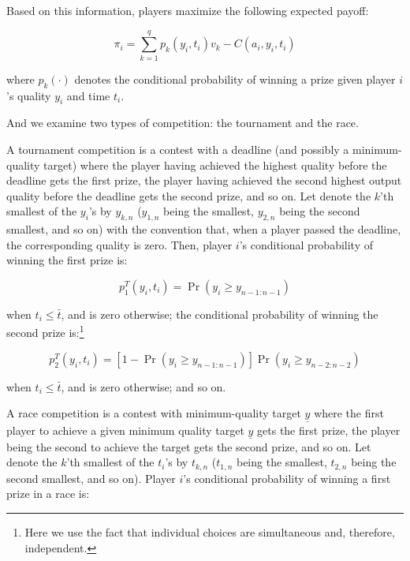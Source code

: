 \documentclass[11pt, titlepage]{article}
\newcommand\deadline{\bar{t}}
\newcommand\target{\underline{y}}
\begin{document}
Based on this information, players maximize the following expected
payoff:

\begin{equation} 
    \label{expected payoff}
    \pi_i = \sum_{k=1}^{q} p_{k}(y_i, t_i) v_k - C(a_i, y_i, t_i)
\end{equation}

where \(p_{k}(\cdot)\) denotes the conditional probability of winning a
prize given player \(i\)'s quality \(y_i\) and time \(t_i\).

And we examine two types of competition: the tournament and the race.

A tournament competition is a contest with a deadline (and possibly a
minimum-quality target) where the player having achieved the highest
quality before the deadline gets the first prize, the player having
achieved the second highest output quality before the deadline gets the
second prize, and so on. Let denote the \(k\)'th smallest of the
\(y_i\)'s by \(y_{k, n}\) (\(y_{1, n}\) being the smallest, \(y_{2, n}\)
being the second smallest, and so on) with the convention that, when a
player passed the deadline, the corresponding quality is zero. Then,
player \(i\)'s conditional probability of winning the first prize is:

\begin{equation}
    p^{T}_{1}(y_i, t_i) = \Pr(y_i \geq y_{n-1:n-1})
\end{equation}

when \(t_i\leq\deadline\), and is zero otherwise; the conditional
probability of winning the second prize is:\footnote{Here we use the
  fact that individual choices are simultaneous and, therefore,
  independent.}

\begin{equation}
    p^{T}_{2}(y_i, t_i) =  [1 - \Pr(y_i \geq y_{n-1:n-1})]  \Pr(y_i \geq y_{n-2:n-2})
\end{equation}

when \(t_i\leq \deadline\), and is zero otherwise; and so on.

A race competition is a contest with minimum-quality target \(\target\)
where the first player to achieve a given minimum quality target
\(\target\) gets the first prize, the player being the second to achieve
the target gets the second prize, and so on. Let denote the \(k\)'th
smallest of the \(t_i\)'s by \(t_{k, n}\) (\(t_{1, n}\) being the
smallest, \(t_{2, n}\) being the second smallest, and so on). Player
\(i\)'s conditional probability of winning a first prize in a race is:
\end{document}
